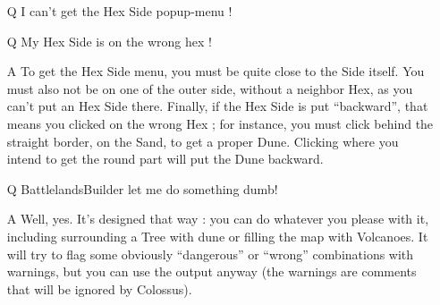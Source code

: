 \documentclass{article}
\begin{document}
\begin{enumerate}

\item[Q] I can't get the Hex Side popup-menu !
\item[Q] My Hex Side is on the wrong hex !

\item[A] To get the Hex Side menu, you must be quite close
to the Side itself. You must also not be on one
of the outer side, without a neighbor Hex, as you
can't put an Hex Side there. Finally, if the Hex
Side is put ``backward'', that means you clicked on
the wrong Hex ; for instance, you must click behind
the straight border, on the Sand, to get a proper
Dune. Clicking where you intend to get the round
part will put the Dune backward.

\item[Q] BattlelandsBuilder let me do something dumb!

\item[A] Well, yes. It's designed that way : you can do
whatever you please with it, including surrounding
a Tree with dune or filling the map with Volcanoes.
It will try to flag some obviously ``dangerous''
or ``wrong'' combinations with warnings, but you
can use the output anyway (the warnings are
comments that will be ignored by Colossus).

\end{enumerate}
\end{document}
